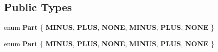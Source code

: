 \subsection*{Public Types}
\begin{DoxyCompactItemize}
\item 
\mbox{\label{classControlStepper_a33d1c458c741e78c561c883dc85f272f}} 
enum {\bfseries Part} \{ \newline
{\bfseries M\+I\+N\+US}, 
{\bfseries P\+L\+US}, 
{\bfseries N\+O\+NE}, 
{\bfseries M\+I\+N\+US}, 
\newline
{\bfseries P\+L\+US}, 
{\bfseries N\+O\+NE}
 \}
\item 
\mbox{\label{classControlStepper_a33d1c458c741e78c561c883dc85f272f}} 
enum {\bfseries Part} \{ \newline
{\bfseries M\+I\+N\+US}, 
{\bfseries P\+L\+US}, 
{\bfseries N\+O\+NE}, 
{\bfseries M\+I\+N\+US}, 
\newline
{\bfseries P\+L\+US}, 
{\bfseries N\+O\+NE}
 \}
\end{DoxyCompactItemize}
